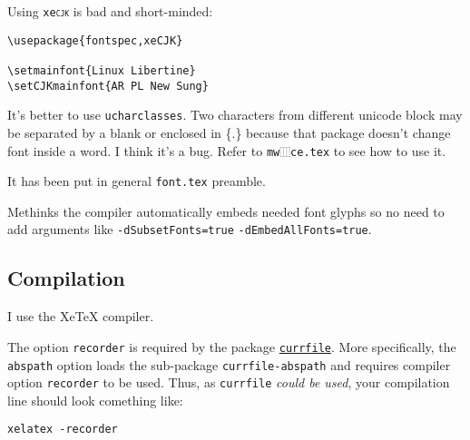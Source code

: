Using \texttt{xe\textsc{cjk}} is bad and short-minded:
\begin{lstlisting}[caption={}]
\usepackage{fontspec,xeCJK}

\setmainfont{Linux Libertine}
\setCJKmainfont{AR PL New Sung}
\end{lstlisting}

It's better to use \texttt{ucharclasses}. Two characters from different unicode block may be separated by a blank or enclosed in \{.\} because that package doesn't change font inside a word. I think it's a bug. Refer to \texttt{mw⿲ce.tex} to see how to use it.

It has been put in general \texttt{font.tex} preamble.

Methinks the compiler automatically embeds needed font glyphs so no need to add arguments like \texttt{-dSubsetFonts=true} \texttt{-dEmbedAllFonts=true}.

\subsection{Compilation}

I use the Xe\TeX{} compiler.

The option \texttt{recorder} is required by the package \href{http://www.ctan.org/tex-archive/macros/latex/contrib/currfile}{\texttt{currfile}}. More specifically, the \texttt{abspath} option loads the sub-package \texttt{currfile-abspath} and requires compiler option \texttt{recorder} to be used. Thus, as \texttt{currfile} \textsl{could be used}, your compilation line should look comething like:

\begin{lstlisting}[caption={}]
xelatex -recorder
\end{lstlisting}
